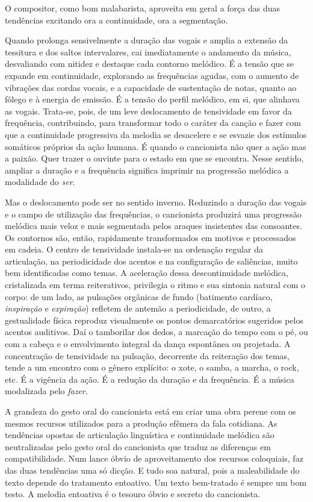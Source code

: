 O compositor, como bom malabarista, aproveita em geral a força das duas
tendências excitando ora a continuidade, ora a segmentação.

Quando prolonga sensivelmente a duração das vogais e amplia a extensão
da tessitura e dos saltos intervalares, cai imediatamente o andamento da
música, desvaliando com nitidez e destaque cada contorno melódico. É a
tensão que se expande em continuidade, explorando as frequências agudas,
com o aumento de vibrações das cordas vocais, e a capacidade de sustentação
de notas, quanto ao fôlego e à energia de emissão. É a tensão do perfil melódico,
em si, que alinhava as vogais. Trata-se, pois, de um leve deslocamento
de tensividade em favor da frequência, contribuindo, para transformar
todo o caráter da canção e fazer com que a continuidade progressiva da
melodia se desacelere e se esvazie dos estímulos somáticos próprios da
ação humana. É quando o cancionista não quer a ação mas a paixão. Quer
trazer o ouvinte para o estado em que se encontra. Nesse sentido,
ampliar a duração e a frequência significa imprimir na progressão
melódica a modalidade do \textit{ser}.

Mas o deslocamento pode ser no sentido inverno. Reduzindo a duração das
vogais e o campo de utilização das frequências, o cancionista produzirá
uma progressão melódica mais veloz e mais segmentada pelos araques
insistentes das consoantes. Os contornos são, então, rapidamente
transformados em motivos e processados em cadeia. O centro de
tensividade instala-se na ordenação regular da articulação, na
periodicidade dos acentos e na configuração de saliências, muito bem
identificadas como temas. A aceleração dessa descontinuidade melódica,
cristalizada em terma reiterativos, privilegia o ritmo e sua sintonia
natural com o corpo: de um lado, as pulsações orgânicas de fundo
(batimento cardíaco, \textit{inspiração} e \textit{expiração}) refletem de antemão a
periodicidade, de outro, a gestualidade física reproduz visualmente os
pontos demarcatórios sugeridos pelos acentos auditivos. Daí o tamborilar
dos dedos, a marcação do tempo com o pé, ou com a cabeça e o
envolvimento integral da dança espontânea ou projetada. A concentração
de tensividade na pulsação, decorrente da reiteração dos temas, tende a
um encontro com o gênero explícito: o xote, o samba, a marcha, o rock,
etc. É a vigência da ação. É a redução da duração e da
frequência. É a música modalizada pelo \textit{fazer}.

A grandeza do gesto oral do cancionista está em criar uma obra perene
com os mesmos recursos utilizados para a produção efêmera da fala
cotidiana. As tendências opostas de articulação linguística e
continuidade melódica são neutralizadas pelo gesto oral do cancionista
que traduz as diferenças em compatibilidade. Num lance óbvio de
aproveitamento dos recursos coloquiais, faz das duas tendências uma só
dicção. E tudo soa natural, pois a maleabilidade do texto depende do
tratamento entoativo. Um texto bem-tratado é sempre um bom testo. A
melodia entoativa é o tesouro óbvio e secreto do cancionista.

